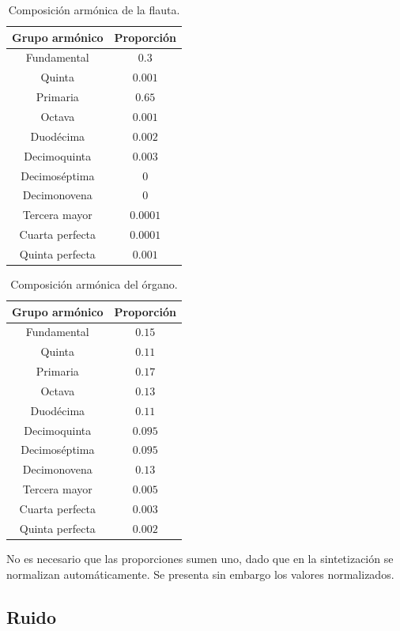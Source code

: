 \begin{multicols}{2}
\begin{table}[H]
\centering
\begin{tabular}{@{}cc@{}}
\toprule
\textbf{Grupo armónico} & \textbf{Proporción} \\ \midrule
Fundamental & $0.3$ \\ 
Quinta & $0.001$ \\ 
 Primaria& $0.65$ \\ 
 Octava& $0.001$ \\ 
 Duodécima& $0.002$ \\ 
 Decimoquinta& $0.003$ \\ 
 Decimoséptima& $0$ \\ 
 Decimonovena& $0$ \\ 
 Tercera mayor& $0.0001$ \\ 
 Cuarta perfecta& $0.0001$ \\ 
 Quinta perfecta& $0.001$ \\ \bottomrule
\end{tabular}
\caption{Composición armónica de la flauta.}
\end{table}
\begin{table}[H]
\centering
\begin{tabular}{@{}cc@{}}
\toprule
\textbf{Grupo armónico} & \textbf{Proporción} \\ \midrule
Fundamental & $0.15$ \\ 
Quinta & $0.11$ \\ 
 Primaria& $0.17$ \\ 
 Octava& $0.13$ \\ 
 Duodécima& $0.11$ \\ 
 Decimoquinta& $0.095$ \\ 
 Decimoséptima& $0.095$ \\ 
 Decimonovena& $0.13$ \\ 
 Tercera mayor& $0.005$ \\ 
 Cuarta perfecta& $0.003$ \\ 
 Quinta perfecta& $0.002$ \\ \bottomrule
\end{tabular}
\caption{Composición armónica del órgano.}
\end{table}
\end{multicols}

No es necesario que las proporciones sumen uno, dado que en la sintetización se normalizan automáticamente. Se presenta sin embargo los valores normalizados.

\subsection{Ruido}

